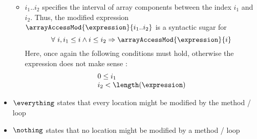 \begin{itemize}
\begin{itemize}
		  \item $ i_1 .. i_2$ specifies the interval of array components between the index $i_1$  and $i_2$.  
		        Thus, the modified expression  $\arrayAccessMod{\expression}{i_1 .. i_2}$ is a syntactic sugar for 
			  $$ \forall \ i ,  i_1 \leq i \wedge  i \leq i_2 \Rightarrow \arrayAccessMod{\expression}{i }$$
			  Here, once again the following conditions must hold, otherwise the expression does not
			  make sense :
			  $$ \begin{array}{l}
			           0  \le i_1 \\
				   i_2  < \length(\expression )
			     \end{array}
			  $$
	    \end{itemize}

      \item $\everything $ states that every location might be modified by the method / loop
      \item $\nothing$ states that no location might be modified by a method / loop
\end{itemize}

